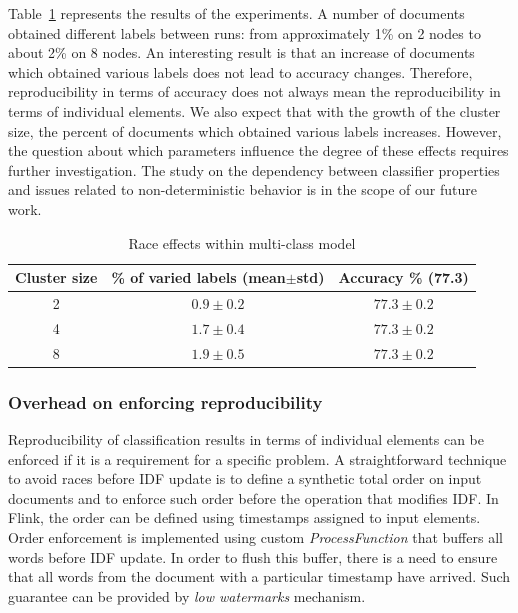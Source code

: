 Table~\ref{race_table} represents the results of the experiments. A number of documents obtained different labels between runs: from approximately 1\% on 2 nodes to about 2\% on 8 nodes. An interesting result is that an increase of documents which obtained various labels does not lead to accuracy changes. Therefore, reproducibility in terms of accuracy does not always mean the reproducibility in terms of individual elements. We also expect that with the growth of the cluster size, the percent of documents which obtained various labels increases. However, the question about which parameters influence the degree of these effects requires further investigation. The study on the dependency between classifier properties and issues related to non-deterministic behavior is in the scope of our future work.

\begin{table}[htbp]
\caption{Race effects within multi-class model}
\begin{threeparttable}
\begin{tabular}{ccc}
Cluster size    & \% of varied labels (mean$\pm$std) & Accuracy \% (77.3)   \\
\hline
2   &   $0.9\pm0.2$    &   $77.3\pm0.2$    \\
4   &   $1.7\pm0.4$    &   $77.3\pm0.2$    \\
8   &   $1.9\pm0.5$    &   $77.3\pm0.2$    \\
\end{tabular}
\end{threeparttable}
\label{race_table}
\end{table}

\subsubsection{Overhead on enforcing reproducibility}

Reproducibility of classification results in terms of individual elements can be enforced if it is a requirement for a specific problem. A straightforward technique to avoid races before IDF update is to define a synthetic total order on input documents and to enforce such order before the operation that modifies IDF. In Flink, the order can be defined using timestamps assigned to input elements. Order enforcement is implemented using custom {\it ProcessFunction} that buffers all words before IDF update. In order to flush this buffer, there is a need to ensure that all words from the document with a particular timestamp have arrived. Such guarantee can be provided by {\em low watermarks} mechanism. 

